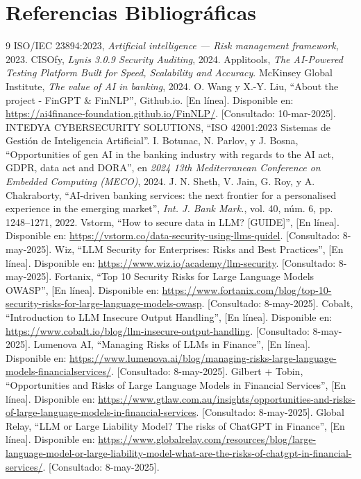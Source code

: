 \documentclass[12pt]{article}
\begin{document}
\section{Referencias Bibliográficas}
\begin{thebibliography}{9}
        ISO/IEC 23894:2023, \emph{Artificial intelligence — Risk management framework}, 2023.
        CISOfy, \emph{Lynis 3.0.9 Security Auditing}, 2024.
        Applitools, \emph{The AI-Powered Testing Platform Built for Speed, Scalability and Accuracy}.
        McKinsey Global Institute, \emph{The value of AI in banking}, 2024.
        O. Wang y X.-Y. Liu, ``About the project - FinGPT \& FinNLP'', Github.io. [En línea]. Disponible en: \url{https://ai4finance-foundation.github.io/FinNLP/}. [Consultado: 10-mar-2025].
        INTEDYA CYBERSECURITY SOLUTIONS, ``ISO 42001:2023 Sistemas de Gestión de Inteligencia Artificial''.
        I. Botunac, N. Parlov, y J. Bosna, ``Opportunities of gen AI in the banking industry with regards to the AI act, GDPR, data act and DORA'', en \emph{2024 13th Mediterranean Conference on Embedded Computing (MECO)}, 2024.
        J. N. Sheth, V. Jain, G. Roy, y A. Chakraborty, ``AI-driven banking services: the next frontier for a personalised experience in the emerging market'', \emph{Int. J. Bank Mark.}, vol. 40, núm. 6, pp. 1248--1271, 2022.
        Vstorm, ``How to secure data in LLM? [GUIDE]'', [En línea]. Disponible en: \url{https://vstorm.co/data-security-using-llms-quidel}. [Consultado: 8-may-2025].
        Wiz, ``LLM Security for Enterprises: Risks and Best Practices'', [En línea]. Disponible en: \url{https://www.wiz.io/academy/llm-security}. [Consultado: 8-may-2025].
        Fortanix, ``Top 10 Security Risks for Large Language Models OWASP'', [En línea]. Disponible en: \url{https://www.fortanix.com/blog/top-10-security-risks-for-large-language-models-owasp}. [Consultado: 8-may-2025].
        Cobalt, ``Introduction to LLM Insecure Output Handling'', [En línea]. Disponible en: \url{https://www.cobalt.io/blog/llm-insecure-output-handling}. [Consultado: 8-may-2025].
        Lumenova AI, ``Managing Risks of LLMs in Finance'', [En línea]. Disponible en: \url{https://www.lumenova.ai/blog/managing-risks-large-language-models-financialservices/}. [Consultado: 8-may-2025].
        Gilbert + Tobin, ``Opportunities and Risks of Large Language Models in Financial Services'', [En línea]. Disponible en: \url{https://www.gtlaw.com.au/insights/opportunities-and-risks-of-large-language-models-in-financial-services}. [Consultado: 8-may-2025].
        Global Relay, ``LLM or Large Liability Model? The risks of ChatGPT in Finance'', [En línea]. Disponible en: \url{https://www.globalrelay.com/resources/blog/large-language-model-or-large-liability-model-what-are-the-risks-of-chatgpt-in-financial-services/}. [Consultado: 8-may-2025].
\end{thebibliography}
\end{document}
